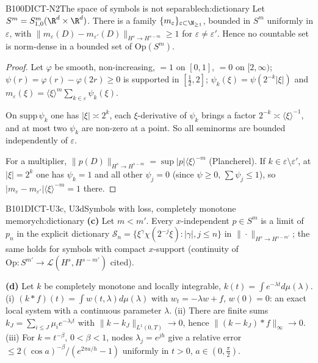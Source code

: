 \begin{dimcard}{B100}{DICT-N2}{The space of symbols is not separable}{\pw}{ch:dictionary}
Let $S^m=S^m_{1,0}(\R^d\times\R^d)$. There is a family $\{m_\varepsilon\}_{\varepsilon\subset\N_{\ge1}}$, bounded in $S^m$ uniformly in $\varepsilon$, with $\|m_\varepsilon(D)-m_{\varepsilon'}(D)\|_{H^s\to H^{s-m}}\ge1$ for $\varepsilon\neq\varepsilon'$. Hence no countable set is norm-dense in a bounded set of $\mathrm{Op}(S^m)$.
\end{dimcard}

\begin{proof}
Let $\varphi$ be smooth, non-increasing, $=1$ on $[0,1]$, $=0$ on $[2,\infty)$; $\psi(r)=\varphi(r)-\varphi(2r)\ge0$ is supported in $[\frac12,2]$; $\psi_k(\xi)=\psi(2^{-k}|\xi|)$ and $m_\varepsilon(\xi)=\langle\xi\rangle^m\sum_{k\in\varepsilon}\psi_k(\xi)$.

On $\mathrm{supp}\,\psi_k$ one has $|\xi|\asymp2^k$, each $\xi$-derivative of $\psi_k$ brings a factor $2^{-k}\asymp\langle\xi\rangle^{-1}$, and at most two $\psi_k$ are non-zero at a point. So all seminorms are bounded independently of $\varepsilon$.

For a multiplier, $\|p(D)\|_{H^s\to H^{s-m}}=\sup|p|\langle\xi\rangle^{-m}$ (Plancherel). If $k\in\varepsilon\setminus\varepsilon'$, at $|\xi|=2^k$ one has $\psi_k=1$ and all other $\psi_j=0$ (since $\psi\ge0$, $\sum\psi_j\le1$), so $|m_\varepsilon-m_{\varepsilon'}|\langle\xi\rangle^{-m}=1$ there.

\end{proof}

\begin{dimcard}{B101}{DICT-U3c, U3d}{Symbols with loss, completely monotone memory}{\pw}{ch:dictionary}
\textbf{(c)} Let $m<m'$. Every $x$-independent $p\in S^m$ is a limit of $p_n$ in the explicit dictionary $\mathcal S_n=\{\xi^\gamma\chi(2^{-j}\xi):|\gamma|,j\le n\}$ in $\|\cdot\|_{H^s\to H^{s-m'}}$; the same holds for symbols with compact $x$-support (continuity of $\mathrm{Op}:S^{m'}\to\mathcal L(H^s,H^{s-m'})$ cited).

\textbf{(d)} Let $k$ be completely monotone and locally integrable, $k(t)=\int e^{-\lambda t}d\mu(\lambda)$. (i) $(k*f)(t)=\int w(t,\lambda)d\mu(\lambda)$ with $w_t=-\lambda w+f$, $w(0)=0$: an exact local system with a continuous parameter $\lambda$. (ii) There are finite sums $k_J=\sum_{i\le J}\mu_ie^{-\lambda_it}$ with $\|k-k_J\|_{L^1(0,T)}\to0$, hence $\|(k-k_J)*f\|_\infty\to0$. (iii) For $k=t^{-\beta}$, $0<\beta<1$, nodes $\lambda_j=e^{jh}$ give a relative error $\le2(\cos a)^{-\beta}/(e^{2\pi a/h}-1)$ uniformly in $t>0$, $a\in(0,\frac\pi2)$.
\end{dimcard}

